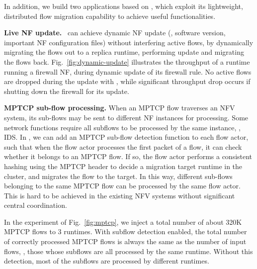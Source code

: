 In addition, we build two applications based on \nfactor, which exploit its lightweight, distributed flow migration capability to achieve useful functionalities. %

\vspace{1mm}
\noindent\textbf{Live NF update.} %
 \nfactor~can achieve dynamic NF update (\eg, software version, important NF configuration files) without interfering active flows, by dynamically migrating the flows out to a replica runtime, performing update and migrating the flows back. Fig.~\ref{fig:dynamic-update} illustrates the throughput of a runtime running a firewall NF, during dynamic update of its firewall rule. No active flows are dropped during the update with \nfactor, while significant throughput drop occurs if shutting down the firewall for its update.

\vspace{1mm}
\noindent\textbf{MPTCP sub-flow processing.} When an MPTCP \cite{wischik2011design} flow traverses an NFV system, its sub-flows may be sent to different NF instances for processing. Some network functions require all subflows to be processed by the same instance, \eg, IDS. %
In \nfactor, we can add an MPTCP sub-flow detection function to each flow actor, such that when the flow actor processes the first packet of a flow, it can check whether it belongs to an MPTCP flow. If so, the flow actor performs a consistent hashing using the MPTCP header to decide a migration target runtime in the cluster, and migrates the flow to the target. In this way, different sub-flows belonging to the same MPTCP flow can be processed by the same flow actor. This is hard to be achieved in the existing NFV systems without significant central coordination. %

In the experiment of Fig.~\ref{fig:mptcp}, we inject a total number of about 320K MPTCP flows to 3 runtimes. With subflow detection enabled, the total number of correctly processed MPTCP flows is always the same as the number of input flows, \ie, those whose subflows are all processed by the same runtime. Without this detection, most of the subflows are processed by different runtimes. %

